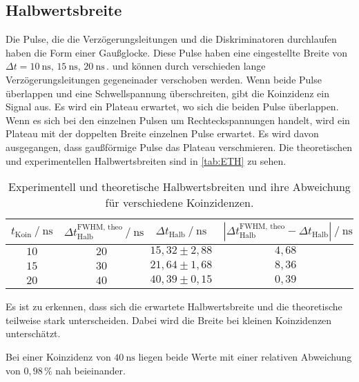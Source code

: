 \subsection{Halbwertsbreite}

Die Pulse, die die Verzögerungsleitungen und die Diskriminatoren durchlaufen haben die Form einer Gaußglocke.
Diese Pulse haben eine eingestellte Breite von $\Delta t = \SI{10}{\nano\second}, \,\SI{15}{\nano\second}, \, \SI{20}{\nano\second}\,.$
und können durch verschieden lange Verzögerungsleitungen gegeneinader verschoben werden.
Wenn beide Pulse überlappen und eine Schwellspannung überschreiten, gibt die Koinzidenz ein Signal aus.
Es wird ein Plateau erwartet, wo sich die beiden Pulse überlappen.
Wenn es sich bei den einzelnen Pulsen um Rechteckspannungen handelt, wird ein Plateau mit der doppelten Breite einzelnen Pulse erwartet.
Es wird davon ausgegangen, dass gaußförmige Pulse das Plateau verschmieren.
Die theoretischen und experimentellen Halbwertsbreiten sind in \autoref{tab:ETH} zu sehen.

\begin{table}[H]
    \centering
    \caption{Experimentell und theoretische Halbwertsbreiten und ihre Abweichung für verschiedene Koinzidenzen.}
    \label{tab:ETH}
    \begin{tabular}{c c c c}
    \toprule
     $t_\text{Koin} \mathbin{/} \unit{\nano\second}$ & $\Delta t_\text{Halb}^{\text{FWHM, theo}} \mathbin{/} \unit{\nano\second}$ & $\Delta t_\text{Halb} \mathbin{/} \unit{\nano\second}$  & $\left|\Delta t_\text{Halb}^{\text{FWHM, theo}} -  \Delta t_\text{Halb} \right| \mathbin{/} \unit{\nano\second} $ \\
    \midrule
        $10$&$ 20$ &$15,32 \pm 2,88$ & $ 4,68$\\ 
        $15$&$ 30$ &$21,64 \pm 1,68$ & $ 8,36$\\ 
        $20$&$ 40$ &$40,39 \pm 0,15$ & $ 0,39$\\ 
    \bottomrule
    \end{tabular}
    \end{table}

Es ist zu erkennen, dass sich die erwartete Halbwertsbreite und die theoretische teilweise stark unterscheiden. 
Dabei wird die Breite bei kleinen Koinzidenzen unterschätzt. 

Bei einer Koinzidenz von $\SI{40}{\nano\second}$ liegen beide Werte mit einer relativen Abweichung von $0,98 \, \%$ nah beieinander.

